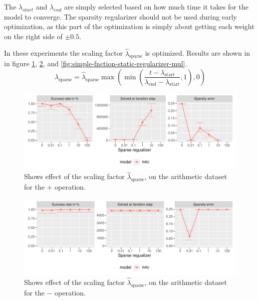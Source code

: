 The $\lambda_{start}$ and $\lambda_{end}$ are simply selected based on how much time it takes for the model to converge. The sparsity regularizer should not be used during early optimization, as this part of the optimization is simply about getting each weight on the right side of $\pm 0.5$.

In these experiments the scaling factor $\hat{\lambda}_{\mathrm{sparse}}$ is optimized. 
Results are shown in in figure \ref{fig:simple-fnction-static-regularizer-add}, \ref{fig:simple-fnction-static-regularizer-sub}, and \ref{fig:simple-fnction-static-regularizer-mul}.
\begin{equation}
\lambda_{\mathrm{sparse}} = \hat{\lambda}_{\mathrm{sparse}} \max(\min(\frac{t - \lambda_{\mathrm{start}}}{\lambda_{\mathrm{end}} - \lambda_{\mathrm{start}}}, 1), 0)
\end{equation}

\begin{figure}[h]
\centering
\includegraphics[width=\linewidth]{results/simple_function_static_regualization_add.pdf}
\caption{Shows effect of the scaling factor $\hat{\lambda}_{\mathrm{sparse}}$, on the arithmetic dataset for the $\bm{+}$ operation.}
\label{fig:simple-fnction-static-regularizer-add}
\end{figure}

\begin{figure}[h]
\centering
\includegraphics[width=\linewidth]{results/simple_function_static_regualization_sub.pdf}
\caption{Shows effect of the scaling factor $\hat{\lambda}_{\mathrm{sparse}}$, on the arithmetic dataset for the $\bm{-}$ operation.}
\label{fig:simple-fnction-static-regularizer-sub}
\end{figure}

